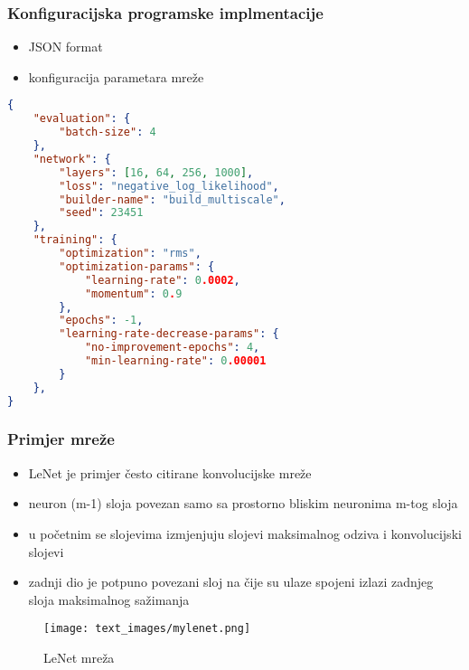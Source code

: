 \documentclass[utf8]{beamer}
\begin{document}

\begin{frame}[fragile]
\frametitle{Konfiguracijska programske implmentacije}

\begin{itemize}
  \item JSON format  %
  \item konfiguracija parametara mreže
\end{itemize}


\begin{lstlisting}[language=json]
{
    "evaluation": {
        "batch-size": 4
    },
    "network": {
        "layers": [16, 64, 256, 1000],
        "loss": "negative_log_likelihood",
        "builder-name": "build_multiscale",
        "seed": 23451
    },
    "training": {
        "optimization": "rms",
        "optimization-params": {
            "learning-rate": 0.0002,
            "momentum": 0.9
        },
        "epochs": -1,
        "learning-rate-decrease-params": {
            "no-improvement-epochs": 4,
            "min-learning-rate": 0.00001
        }
    },
}
\end{lstlisting}

\end{frame}


\begin{frame}
\frametitle{Primjer mreže}

\begin{itemize}
  \item LeNet je primjer često citirane konvolucijske mreže
  \item neuron (m-1) sloja povezan samo sa prostorno bliskim neuronima m-tog sloja
  \item u početnim se slojevima izmjenjuju slojevi maksimalnog odziva i konvolucijski slojevi
  \item zadnji dio je potpuno povezani sloj na čije su ulaze spojeni izlazi zadnjeg sloja maksimalnog sažimanja
\end{itemize}

\begin{figure}
\centering
\texttt{[image: text\_images/mylenet.png]}
\caption{LeNet mreža}
\end{figure}

\end{frame}

\end{document}
